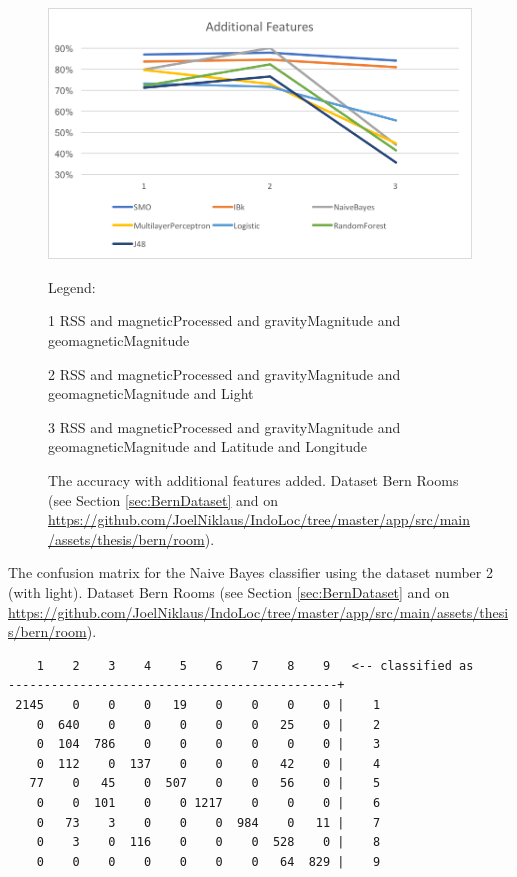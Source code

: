 \begin{figure}[H]
\centering
\includegraphics[width=150mm]{Figures/AdditionalFeatures.png}
\decoRule
\caption[AdditionalFeatures]{The accuracy with additional features added. Dataset Bern Rooms (see Section \ref{sec:BernDataset} and on \url{https://github.com/JoelNiklaus/IndoLoc/tree/master/app/src/main/assets/thesis/bern/room}).}
\label{fig:AdditionalFeatures}

\begin{threeparttable}
\begin{tablenotes}
      \item Legend:
      \item[1] RSS and magneticProcessed and gravityMagnitude and geomagneticMagnitude
\item[2] RSS and magneticProcessed and gravityMagnitude and geomagneticMagnitude and Light
\item[3] RSS and magneticProcessed and gravityMagnitude and geomagneticMagnitude and Latitude and Longitude
    \end{tablenotes}
	\end{threeparttable}

\end{figure}



\begin{table}[H]
\caption{The confusion matrix for the Naive Bayes classifier using the dataset number 2 (with light). Dataset Bern Rooms (see Section \ref{sec:BernDataset} and on \url{https://github.com/JoelNiklaus/IndoLoc/tree/master/app/src/main/assets/thesis/bern/room}).}
\label{ver:ConfusionMatrix}

\begin{verbatim}
    1    2    3    4    5    6    7    8    9   <-- classified as
----------------------------------------------+
 2145    0    0    0   19    0    0    0    0 |    1
    0  640    0    0    0    0    0   25    0 |    2
    0  104  786    0    0    0    0    0    0 |    3
    0  112    0  137    0    0    0   42    0 |    4
   77    0   45    0  507    0    0   56    0 |    5
    0    0  101    0    0 1217    0    0    0 |    6
    0   73    3    0    0    0  984    0   11 |    7
    0    3    0  116    0    0    0  528    0 |    8
    0    0    0    0    0    0    0   64  829 |    9
\end{verbatim}
\end{table}


